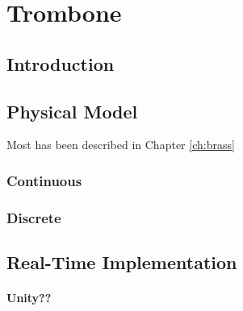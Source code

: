 \chapter{Trombone}\label{ch:trombone}
\section{Introduction}

\section{Physical Model}
Most has been described in Chapter \ref{ch:brass}

\subsection{Continuous}

\subsection{Discrete}

\section{Real-Time Implementation}
\subsubsection{Unity??}